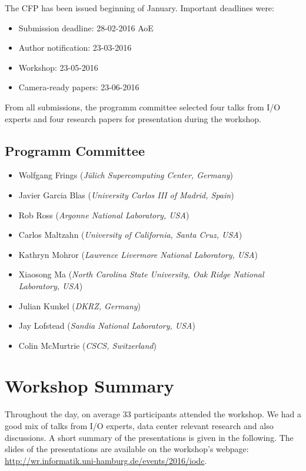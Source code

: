 \documentclass{llncs}
\begin{document}
\noindent The CFP has been issued beginning of January.
Important deadlines were:
\begin{itemize}
  \item Submission deadline: 28-02-2016 AoE
  \item Author notification: 23-03-2016
  \item Workshop: 23-05-2016
  \item Camera-ready papers: 23-06-2016  
\end{itemize}

From all submissions, the programm committee selected four talks from I/O experts and four research papers for presentation during the workshop.

\subsection{Programm Committee}
\begin{itemize}
  \item Wolfgang Frings (\textit{Jülich Supercomputing Center, Germany})
  \item Javier Garcia Blas (\textit{University Carlos III of Madrid, Spain})
  \item  Rob Ross (\textit{Argonne National Laboratory, USA})
  \item   Carlos Maltzahn (\textit{University of California, Santa Cruz, USA})
  \item  Kathryn Mohror (\textit{Lawrence Livermore National Laboratory, USA})
  \item  Xiaosong Ma (\textit{North Carolina State University, Oak Ridge National Laboratory, USA})
  \item  Julian Kunkel (\textit{DKRZ, Germany})
  \item  Jay Lofstead (\textit{Sandia National Laboratory, USA})
  \item  Colin McMurtrie (\textit{CSCS, Switzerland})
\end{itemize}



\section{Workshop Summary}
\label{sec:summary}

Throughout the day, on average 33 participants attended the workshop.
We had a good mix of talks from I/O experts, data center relevant research and also discussions.
A short summary of the presentations is given in the following.
The slides of the presentations are available on the workshop's webpage: \\ 
\url{http://wr.informatik.uni-hamburg.de/events/2016/iodc}.
\end{document}
